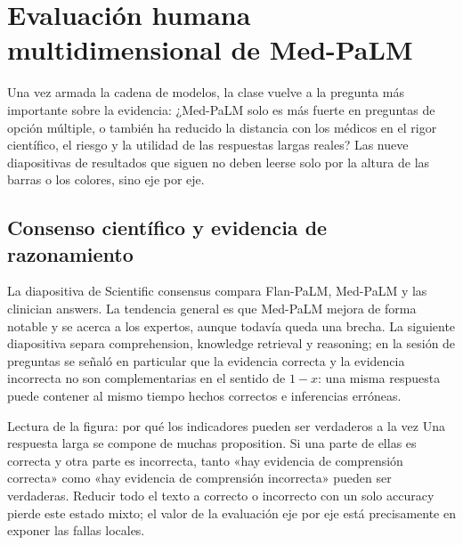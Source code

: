 \section{Evaluación humana multidimensional de Med-PaLM}

Una vez armada la cadena de modelos, la clase vuelve a la pregunta más importante sobre la evidencia: ¿Med-PaLM solo es más fuerte en preguntas de opción múltiple, o también ha reducido la distancia con los médicos en el rigor científico, el riesgo y la utilidad de las respuestas largas reales? Las nueve diapositivas de resultados que siguen no deben leerse solo por la altura de las barras o los colores, sino eje por eje.

\subsection{Consenso científico y evidencia de razonamiento}

La diapositiva de Scientific consensus compara Flan-PaLM, Med-PaLM y las clinician answers. La tendencia general es que Med-PaLM mejora de forma notable y se acerca a los expertos, aunque todavía queda una brecha. La siguiente diapositiva separa comprehension, knowledge retrieval y reasoning; en la sesión de preguntas se señaló en particular que la evidencia correcta y la evidencia incorrecta no son complementarias en el sentido de $1-x$: una misma respuesta puede contener al mismo tiempo hechos correctos e inferencias erróneas.




\begin{knowledgebox}{Lectura de la figura: por qué los indicadores pueden ser verdaderos a la vez}
Una respuesta larga se compone de muchas proposition. Si una parte de ellas es correcta y otra parte es incorrecta, tanto «hay evidencia de comprensión correcta» como «hay evidencia de comprensión incorrecta» pueden ser verdaderas. Reducir todo el texto a correcto o incorrecto con un solo accuracy pierde este estado mixto; el valor de la evaluación eje por eje está precisamente en exponer las fallas locales.
\end{knowledgebox}

